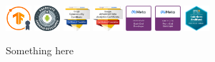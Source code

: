 \documentclass[a4paper,9pt]{article}
\begin{document}
\vspace{-1.0mm}
\par\medskip
\noindent\hspace*{-1cm}\colorbox{gray!8}{%
    \parbox{\paperwidth}{
        \begin{center}
            \includegraphics[width=0.071\textwidth,valign=t]{images/tensorflow.png}\hspace{0.01\textwidth}
            \includegraphics[width=0.071\textwidth,valign=t]{images/android.png}\hspace{0.01\textwidth}
            \includegraphics[width=0.073\textwidth,valign=t]{images/cybersecurity.png}\hspace{0.01\textwidth}
            \includegraphics[width=0.082\textwidth,valign=t]{images/1.png}\hspace{0.01\textwidth}
            \includegraphics[width=0.071\textwidth,valign=t]{images/meta_backend.png}\hspace{0.01\textwidth}
            \includegraphics[width=0.071\textwidth,valign=t]{images/meta_frontend.png}\hspace{0.01\textwidth}
            \includegraphics[width=0.071\textwidth,valign=t]{images/aws.png}\hspace{0.01\textwidth}
        \end{center}
    }%
}\hspace*{-1cm}\par\medskip

\vspace{12cm}
Something here
\vspace{12cm}
\end{document}
